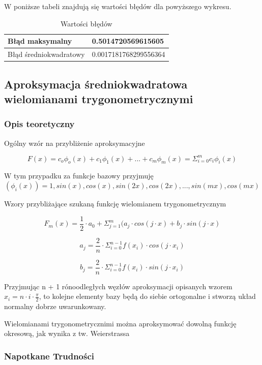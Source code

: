 \documentclass{article}
\begin{document}
W poniższe tabeli znajdują się wartości błędów dla powyższego wykresu.

\begin{table}[!ht]
    \centering
    \begin{tabular}{|l|l|}
    \hline
        Błąd maksymalny & 0.5014720569615605 \\ \hline
        Błąd średniokwadratowy & 0.0017181768299556364 \\ \hline
    \end{tabular}
    \caption{Wartości błędów}
\end{table}

\newpage

\subsection{Aproksymacja średniokwadratowa wielomianami trygonometrycznymi}

\subsubsection{Opis teoretyczny}

Ogólny wzór na przybliżenie aproksymacyjne

\[F(x) = c_o\phi_o(x) + c_1\phi_1(x) + ... + c_m\phi_m(x) = \Sigma_{i=0}^{m}c_i\phi_i(x)\]

\noindent
W tym przypadku za funkcje bazowy przyjmuję
\[(\phi_i(x)) = 1, sin(x), cos(x), sin(2x), cos(2x), ..., sin(mx), cos(mx)\]

\noindent
Wzory przybliżające szukaną funkcję wielomianem trygonometrycznym

\[F_m(x) = \frac{1}{2} \cdot a_0 + \Sigma_{j=1}^{m}(a_j \cdot cos(j \cdot x) + b_j \cdot sin(j \cdot x)\]

\[a_j = \frac{2}{n} \cdot \Sigma_{i=0}^{n-1}f(x_i) \cdot cos(j \cdot x_i)\]

\[b_j = \frac{2}{n} \cdot \Sigma_{i=0}^{n-1}f(x_i) \cdot sin(j \cdot x_i)\]

\noindent
Przyjmując n + 1 rónoodległych węzłów aproksymacji opisanych wzorem \(x_i = n \cdot i \cdot \frac{\pi}{2}\), to kolejne elementy bazy będą do siebie ortogonalne i stworzą układ normalny dobrze uwarunkowany.

\noindent
Wielomianami trygonometrycznimi można aproksymować dowolną funkcję okresową, jak wynika z tw. Weierstrassa

\subsubsection{Napotkane Trudności}
\end{document}
